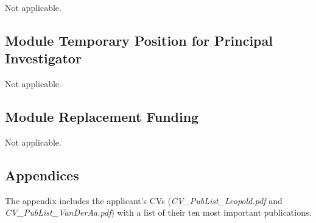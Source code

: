 \documentclass{scrartcl}
\begin{document}
Not applicable. 

\subsection{Module Temporary Position for Principal Investigator}

Not applicable. 

\subsection{Module Replacement Funding}

Not applicable. 

\subsection*{Appendices}

The appendix includes the applicant's CVs (\textit{CV\_PubList\_Leopold.pdf} and \textit{CV\_PubList\_VanDerAa.pdf}) with a list of their ten most important publications.  
\end{document}
